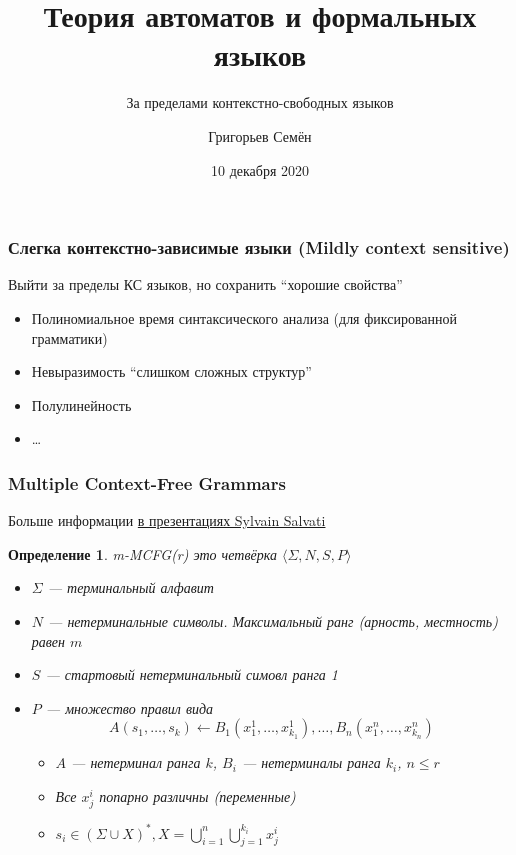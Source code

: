 \documentclass{beamer}
\title[]{Теория автоматов и формальных языков}
\subtitle[]{За пределами контекстно-свободных языков}
\institute[]{
Санкт-Петербургский государственный университет\\
}
\author[]{Григорьев Семён}
\date{10 декабря 2020}
\newtheorem{rudefinition}{Определение}
\begin{document}
{
  \begin{frame}
    \titlepage
  \end{frame}
}

\begin{frame}[fragile]  
  \frametitle{Слегка контекстно-зависимые языки (Mildly context sensitive)}
   Выйти за пределы КС языков, но сохранить ``хорошие свойства''
   \begin{itemize}
    \item Полиномиальное время синтаксического анализа (для фиксированной грамматики)
    \item Невыразимость ``слишком сложных структур''
    \item Полулинейность
    \item \ldots
   \end{itemize}
\end{frame}


\begin{frame}[fragile]
  \frametitle{Multiple Context-Free Grammars}
  Больше информации \href{https://www.labri.fr/perso/salvati/downloads/cours/esslli/}{в презентациях Sylvain Salvati}
  \begin{rudefinition}
    \textit{m-MCFG(r)} это четвёрка $\langle \Sigma, N, S, P \rangle$  
    \begin{itemize}
      \item $\Sigma$ --- терминальный алфавит
      \item $N$ --- нетерминальные символы. Максимальный ранг (арность, местность) равен $m$ 
      \item $S$ --- стартовый нетерминальный симовл ранга 1
      \item $P$ --- множество правил вида 
      $$
      A(s_1,\ldots,s_k) \leftarrow B_1(x_1^1,\ldots,x_{k_1}^1), \ldots, B_n(x_1^n,\ldots,x_{k_n}^n)  
      $$
      \begin{itemize}
        \item $A$ --- нетерминал ранга $k$, $B_i$ --- нетерминалы ранга $k_i$, $n \leq r$
        \item Все $x^i_j$ попарно различны (переменные)
        \item $s_i \in (\Sigma \cup X)^*, X = \bigcup_{i=1}^n \bigcup_{j=1}^{k_i} {x^i_j}$        
      \end{itemize}    
  \end{itemize}
  \end{rudefinition}
\end{frame}
\end{document}
